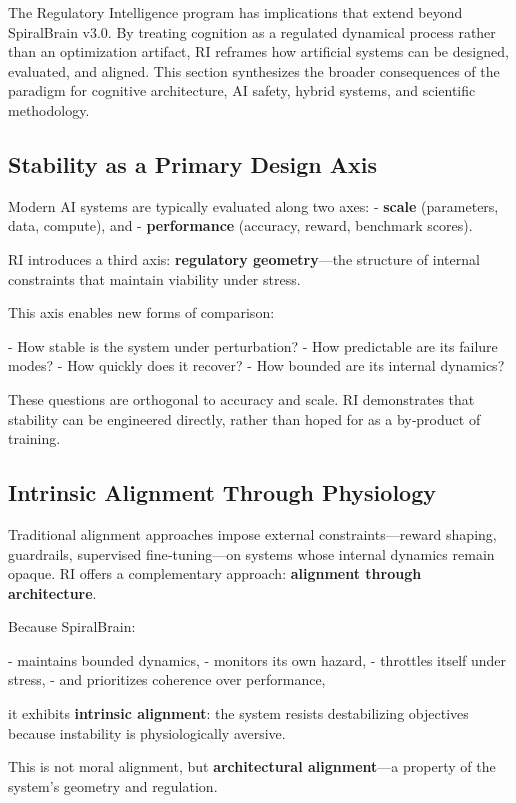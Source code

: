 \documentclass[12pt,a4paper]{report}
\begin{document}
The Regulatory Intelligence program has implications that extend beyond SpiralBrain v3.0. By treating cognition as a regulated dynamical process rather than an optimization artifact, RI reframes how artificial systems can be designed, evaluated, and aligned. This section synthesizes the broader consequences of the paradigm for cognitive architecture, AI safety, hybrid systems, and scientific methodology.

\subsection{Stability as a Primary Design Axis}

Modern AI systems are typically evaluated along two axes:  
- \textbf{scale} (parameters, data, compute), and  
- \textbf{performance} (accuracy, reward, benchmark scores).

RI introduces a third axis: \textbf{regulatory geometry}—the structure of internal constraints that maintain viability under stress.

This axis enables new forms of comparison:

- How stable is the system under perturbation?  
- How predictable are its failure modes?  
- How quickly does it recover?  
- How bounded are its internal dynamics?  

These questions are orthogonal to accuracy and scale. RI demonstrates that stability can be engineered directly, rather than hoped for as a by‑product of training.

\subsection{Intrinsic Alignment Through Physiology}

Traditional alignment approaches \cite{Russell2019} impose external constraints—reward shaping, guardrails, supervised fine‑tuning—on systems whose internal dynamics remain opaque. RI offers a complementary approach: \textbf{alignment through architecture}.

Because SpiralBrain:

- maintains bounded dynamics,  
- monitors its own hazard,  
- throttles itself under stress,  
- and prioritizes coherence over performance,  

it exhibits \textbf{intrinsic alignment}: the system resists destabilizing objectives because instability is physiologically aversive.

This is not moral alignment, but \textbf{architectural alignment}—a property of the system’s geometry and regulation.
\end{document}
